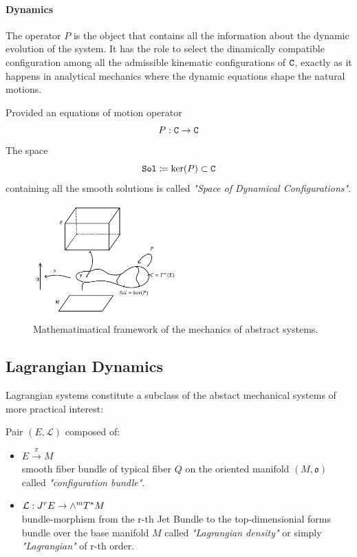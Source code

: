 \documentclass[Main]{subfiles}
\begin{document}
	\paragraph{Dynamics}
	The operator $P$ is the object that contains all the information about the dynamic evolution of the system.
	It has the role to select the dinamically compatible configuration among all the admissible kinematic configurations of $\mathtt{C}$, exactly as it happens in analytical mechanics where the dynamic equations shape the natural motions.
	\begin{notationfix}
		Provided an equations of motion operator
		\begin{displaymath}
			P: \mathtt{C} \rightarrow \mathtt{C}
		\end{displaymath}
		The space
		\begin{displaymath}
		\mathtt{Sol} \coloneqq \ker(P) \subset \mathtt{C}
		\end{displaymath}
		containing all the smooth solutions is called \emph{"Space of Dynamical Configurations"}.
	\end{notationfix}
	
	\begin{figure}[h!]
		\centering
		\includegraphics[width=0.5\textwidth]{Pictures/AbstractFieldTheory} 
		 	 	\caption{Mathematimatical framework of the mechanics of abstract systems. }
	\end{figure}	
	
	\subsection{Lagrangian Dynamics}	
	Lagrangian systems constitute a subclass of the abstact mechanical systems of more practical interest:	
		\begin{definition}
	Pair $(E, \mathcal{L} )$ composed of:
		\begin{itemize}
			\item $E \xrightarrow{\pi} M$ \\smooth fiber bundle of typical fiber $Q$ on the oriented manifold $(M,\mathfrak{o})$ called \emph{"configuration bundle"}.
			\item	$ \mathcal{L} : J^r E \rightarrow \wedge^m T^*M$ \\bundle-morphism from the r-th Jet Bundle to  the top-dimensionial forms bundle over the base manifold $M$  called \emph{"Lagrangian density"} or simply \emph{"Lagrangian"} of r-th order.
		\end{itemize}
	\end{definition}	
	
\end{document}

